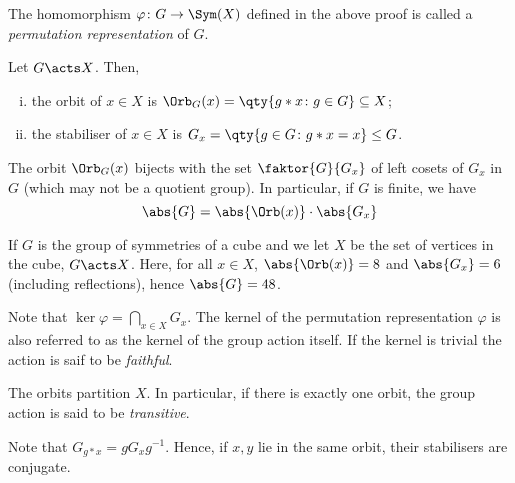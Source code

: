 \begin{definition}
	The homomorphism \( \varphi \colon G \to \Sym(X) \) defined in the above proof is called a \textit{permutation representation} of \( G \).
\end{definition}
\begin{definition}
	Let \( G \acts X \).
	Then,
	\begin{enumerate}[(i)]
		\item the orbit of \( x \in X \) is \( \Orb_G(x) = \qty{g \ast x \colon g \in G} \subseteq X \);
		\item the stabiliser of \( x \in X \) is \( G_x = \qty{g \in G \colon g \ast x = x} \leq G \).
	\end{enumerate}
\end{definition}
\begin{theorem}
	The orbit \( \Orb_G(x) \) bijects with the set \( \faktor{G}{G_x} \) of left cosets of \( G_x \) in \( G \) (which may not be a quotient group).
	In particular, if \( G \) is finite, we have
	\[ \abs{G} = \abs{\Orb(x)} \cdot \abs{G_x} \]
\end{theorem}
\begin{example}
	If \( G \) is the group of symmetries of a cube and we let \( X \) be the set of vertices in the cube, \( G \acts X \).
	Here, for all \( x \in X \), \( \abs{\Orb(x)} = 8 \) and \( \abs{G_x} = 6 \) (including reflections), hence \( \abs{G} = 48 \).
\end{example}
\begin{remark}
	Note that \( \ker \varphi = \bigcap_{x \in X} G_x \).
	The kernel of the permutation representation \( \varphi \) is also referred to as the kernel of the group action itself.
	If the kernel is trivial the action is saif to be \textit{faithful}.

	The orbits partition \( X \).
	In particular, if there is exactly one orbit, the group action is said to be \textit{transitive}.

	Note that \( G_{g \ast x} = g G_x g^{-1} \).
	Hence, if \( x, y \) lie in the same orbit, their stabilisers are conjugate.
\end{remark}

